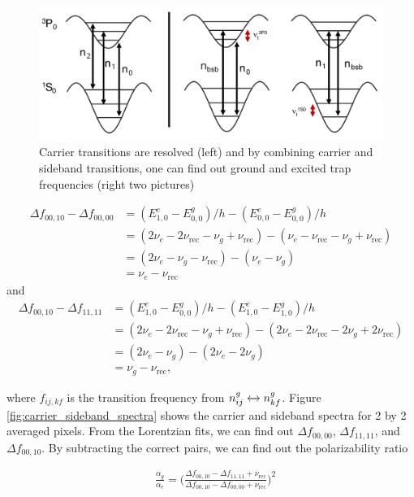 \documentclass[bibnotes]{article}
\begin{document}
		\begin{figure}
		    \centering
		    \includegraphics[scale=0.8]{figures/trap_frequency_schematics.pdf}
		    \caption{Carrier transitions are resolved (left) and by combining carrier and sideband transitions, one can find out ground and excited trap frequencies (right two pictures)}
		    \label{fig:trap_frequency_schematics}
		\end{figure}

			\begin{align*}
				\Delta f_{00,10}-\Delta f_{00,00}&=(E^{e}_{1,0}-E^{g}_{0,0})/h-(E^{e}_{0,0}-E^{g}_{0,0})/h \\
				&=(2\nu_e-2\nu_{\text{rec}}-\nu_g+\nu_{\text{rec}})-(\nu_e-\nu_{\text{rec}}-\nu_g+\nu_{\text{rec}}) \\		
				&=(2\nu_e-\nu_g-\nu_{\text{rec}})-(\nu_e-\nu_g) \\	
				&=\nu_e-\nu_{\text{rec}}
			\end{align*}
		and
			\begin{align*}
				\Delta f_{00,10}-\Delta f_{11,11}&=(E^{e}_{1,0}-E^{g}_{0,0})/h-(E^{e}_{1,0}-E^{g}_{1,0})/h \\
				&=(2\nu_e-2\nu_{\text{rec}}-\nu_g+\nu_{\text{rec}})-(2\nu_e-2\nu_{\text{rec}}-2\nu_g+2\nu_{\text{rec}}) \\		
				&=(2\nu_e-\nu_g)-(2\nu_e-2\nu_g) \\	
				&=\nu_g-\nu_{\text{rec}},
			\end{align*}

		\noindent where $f_{ij,kf}$ is the transition frequency from $n^{g}_{ij}\xleftrightarrow{} n^{g}_{kf}$.
		Figure \ref{fig:carrier_sideband_spectra} shows the carrier and sideband spectra for 2 by 2 averaged pixels. From the Lorentzian fits, we can find out $\Delta f_{00,00}$, $\Delta f_{11,11}$, and $\Delta f_{00,10}$. By subtracting the correct pairs, we can find out the polarizability ratio

		\begin{align*}
			&\frac{\alpha_g}{\alpha_e}=\bigg(\frac{\Delta f_{00,10}-\Delta f_{11,11}+\nu_{\text{rec}}}{\Delta f_{00,10}-\Delta f_{00,00}+\nu_{\text{rec}}}\bigg)^{2}
		\end{align*}
\end{document}

